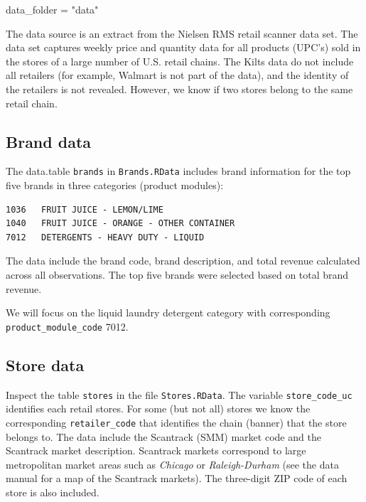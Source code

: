 \documentclass[
]{article}
\newenvironment{Shaded}{\begin{snugshade}}{\end{snugshade}}
\newcommand{\NormalTok}[1]{#1}
\newcommand{\OtherTok}[1]{\textcolor[rgb]{0.56,0.35,0.01}{#1}}
\newcommand{\StringTok}[1]{\textcolor[rgb]{0.31,0.60,0.02}{#1}}
\begin{document}
\begin{Shaded}
\begin{Highlighting}[]
\NormalTok{data\_folder }\OtherTok{=} \StringTok{"data"}
\end{Highlighting}
\end{Shaded}

\bigskip

The data source is an extract from the Nielsen RMS retail scanner data
set. The data set captures weekly price and quantity data for all
products (UPC's) sold in the stores of a large number of U.S. retail
chains. The Kilts data do not include all retailers (for example,
Walmart is not part of the data), and the identity of the retailers is
not revealed. However, we know if two stores belong to the same retail
chain.

\subsection{Brand data}\label{brand-data}

The data.table \texttt{brands} in \texttt{Brands.RData} includes brand
information for the top five brands in three categories (product
modules):

\begin{verbatim}
1036   FRUIT JUICE - LEMON/LIME
1040   FRUIT JUICE - ORANGE - OTHER CONTAINER
7012   DETERGENTS - HEAVY DUTY - LIQUID
\end{verbatim}

The data include the brand code, brand description, and total revenue
calculated across all observations. The top five brands were selected
based on total brand revenue.

We will focus on the liquid laundry detergent category with
corresponding \texttt{product\_module\_code} 7012.

\subsection{Store data}\label{store-data}

Inspect the table \texttt{stores} in the file \texttt{Stores.RData}. The
variable \texttt{store\_code\_uc} identifies each retail stores. For
some (but not all) stores we know the corresponding
\texttt{retailer\_code} that identifies the chain (banner) that the
store belongs to. The data include the Scantrack (SMM) market code and
the Scantrack market description. Scantrack markets correspond to large
metropolitan market areas such as \emph{Chicago} or
\emph{Raleigh-Durham} (see the data manual for a map of the Scantrack
markets). The three-digit ZIP code of each store is also included.
\end{document}
